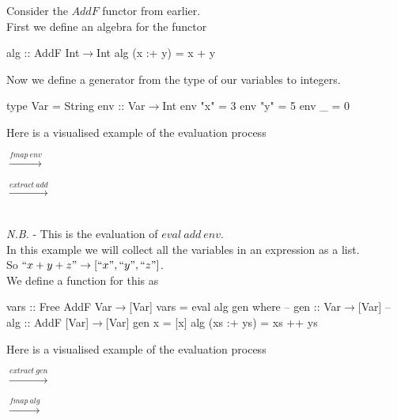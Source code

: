 \documentclass[11pt,a4paper]{article}
\begin{document}
Consider the $AddF$ functor from earlier.\\
First we define an algebra for the functor
\begin{code}
alg :: AddF Int$\to$Int
alg (x :+ y) = x + y
\end{code}
Now we define a generator from the type of our variables to integers.
\begin{code}
type Var = String
env :: Var$\to$Int
env "x" = 3
env "y" = 5
env _   = 0
\end{code}
Here is a visualised example of the evaluation process\\
$\xrightarrow{fmap\ env}$
$\xrightarrow{extract\ add}$
\\
\textit{N.B.} - This is the evaluation of $eval\ add\ env$.\\

In this example we will collect all the variables in an expression as a list.\\
So $``x+y+z"\to[``x",``y",``z"]$.\\
We define a function for this as
\begin{code}
vars :: Free AddF Var$\to$[Var]
vars = eval alg gen
  where
    -- gen :: Var$\to$[Var]
    -- alg :: AddF [Var]$\to$[Var]
       gen x          = [x]
       alg (xs :+ ys) = xs ++ ys
\end{code}
Here is a visualised example of the evaluation process\\
$\xrightarrow{extract\ gen}$
$\xrightarrow{fmap\ alg}$
\end{document}

